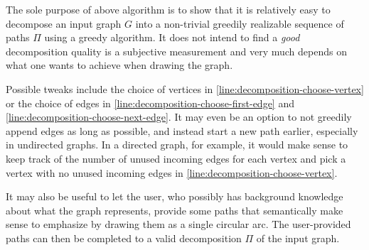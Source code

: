 The sole purpose of above algorithm is to show that it is relatively easy to decompose an input graph ${G}$ into a non-trivial greedily realizable sequence of paths ${\Pi}$ using a greedy algorithm. It does not intend to find a \emph{good} decomposition \emdash quality is a subjective measurement and very much depends on what one wants to achieve when drawing the graph.

Possible tweaks include the choice of vertices in \cref{line:decomposition-choose-vertex} or the choice of edges in \cref{line:decomposition-choose-first-edge} and \cref{line:decomposition-choose-next-edge}. It may even be an option to not greedily append edges as long as possible, and instead start a new path earlier, especially in undirected graphs. In a directed graph, for example, it would make sense to keep track of the number of unused incoming edges for each vertex and pick a vertex with no unused incoming edges in \cref{line:decomposition-choose-vertex}.

It may also be useful to let the user, who possibly has background knowledge about what the graph represents, provide some paths that semantically make sense to emphasize by drawing them as a single circular arc. The user-provided paths can then be completed to a valid decomposition ${\Pi}$ of the input graph.
